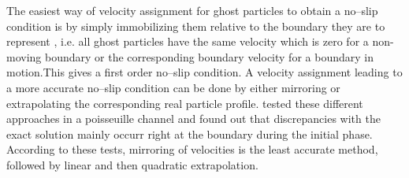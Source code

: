 \documentclass{report}
\begin{document}
The easiest way of velocity assignment for ghost particles to obtain a no--slip condition is by simply immobilizing them relative to the boundary they are to represent \cite{Morris1997}, i.e. all ghost particles have the same velocity which is zero for a non-moving boundary or the corresponding boundary velocity for a boundary in motion.This gives a first order no--slip condition. A velocity assignment leading to a more accurate no--slip condition can be done by either mirroring or extrapolating the corresponding real particle profile. \cite{Basa2009} tested these different approaches in a poisseuille channel and found out that discrepancies with the exact solution mainly occurr right at the boundary during the initial phase.  According to these tests, mirroring of velocities is the least accurate method, followed by linear and then quadratic extrapolation. 
\end{document}
